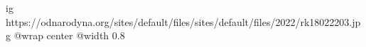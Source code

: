  
 
 
 
 

\ifcmt
  ig https://odnarodyna.org/sites/default/files/sites/default/files/2022/rk18022203.jpg
  @wrap center
  @width 0.8
\fi
